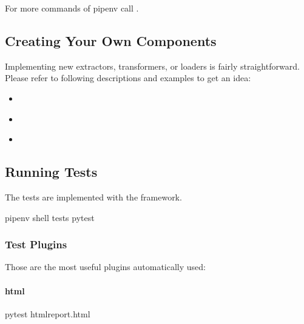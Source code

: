 \documentclass[a4paper,10pt, twoside,english]{sphinxmanual}
\begin{document}
For more commands of pipenv call .


\subsection{Creating Your Own Components}
\label{\detokenize{setup_development_testing:creating-your-own-components}}
Implementing new extractors, transformers, or loaders is fairly straightforward.
Please refer to following descriptions and examples to get an idea:
\begin{itemize}
\item {} 
{\hyperref[\detokenize{base_classes/extractor:custom-extractor}]{}}

\item {} 
{\hyperref[\detokenize{base_classes/transformer:custom-transformer}]{}}

\item {} 
{\hyperref[\detokenize{base_classes/loader:custom-loader}]{}}

\end{itemize}


\subsection{Running Tests}
\label{\detokenize{setup_development_testing:running-tests}}
The tests are implemented with the  framework.
\def\sphinxLiteralBlockLabel{\label{\detokenize{setup_development_testing:id12}}}
\begin{sphinxVerbatim}[commandchars=\\\{\}]
\PYGZdl{} pipenv shell
\PYGZdl{}  tests
\PYGZdl{} pytest
\end{sphinxVerbatim}


\subsubsection{Test Plugins}
\label{\detokenize{setup_development_testing:test-plugins}}
Those are the most useful plugins automatically used:


\paragraph{html}
\label{\detokenize{setup_development_testing:id1}}
\def\sphinxLiteralBlockLabel{\label{\detokenize{setup_development_testing:id13}}}
\begin{sphinxVerbatim}[commandchars=\\\{\}]
\PYGZdl{} pytest \PYGZhy{}\PYGZhy{}htmlreport.html
\end{sphinxVerbatim}
\end{document}
